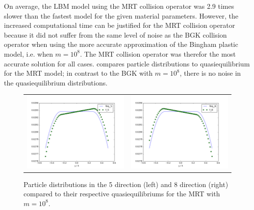 \documentclass[pdftex,ms]{pittetd}
\begin{document}
On average, the LBM model using the MRT collision operator was 2.9 times slower than the fastest model for the given material parameters.
However, the increased computational time can be justified for the MRT collision operator because it did not suffer from the same level of noise as the BGK collision operator when using the more accurate approximation of the Bingham plastic model, i.e. when $m = 10^8$. 
The MRT collision operator was therefor the most accurate solution for all cases.
 compares particle distributions to quasiequilibrium for the MRT model; in contrast to the BGK with $m = 10^8$, there is no noise in the quasiequilibrium distributions.

\begin{figure}
	\centering
    \begin{tabulary}{\linewidth}{c c}
        \includegraphics[width=2.1in]{figs/poise-bingham/mrt/feq-vs-f_5.png}
        &
        \includegraphics[width=2.1in]{figs/poise-bingham/mrt/feq-vs-f_8.png}
    \end{tabulary}
    \caption{Particle distributions in the 5 direction (left) and 8 direction (right) compared to their respective quasiequilibriums for the MRT with $m = 10^8$.}
    \label{fig:feq-vs-f_mrt}
\end{figure}
\end{document}

